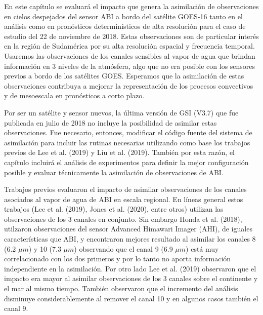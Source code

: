\documentclass[12pt,oneside,a4paper]{reedthesis}
\begin{document}
En este capítulo se evaluará el impacto que genera la asimilación de observaciones en cielos despejados del sensor ABI a bordo del satélite GOES-16 tanto en el análisis como en pronósticos determinísticos de alta resolución para el caso de estudio del 22 de noviembre de 2018. Estas observaciones son de particular interés en la región de Sudamérica por su alta resolución espacial y frecuencia temporal. Usaremos las observaciones de los canales sensibles al vapor de agua que brindan información en 3 niveles de la atmósfera, algo que no era posible con los sensores previos a bordo de los satélites GOES. Esperamos que la asimilación de estas observaciones contribuya a mejorar la representación de los procesos convectivos y de mesoescala en pronósticos a corto plazo.

Por ser un satélite y sensor nuevos, la última versión de GSI (V3.7) que fue publicada en julio de 2018 no incluye la posibilidad de asimilar estas observaciones. Fue necesario, entonces, modificar el código fuente del sistema de asimilación para incluir las rutinas necesarias utilizando como base los trabajos previos de Lee et al. (2019) y Liu et al. (2019). También por esta razón, el capítulo incluirá el análisis de experimentos para definir la mejor configuración posible y evaluar técnicamente la asimilación de observaciones de ABI.

Trabajos previos evaluaron el impacto de asimilar observaciones de los canales asociados al vapor de agua de ABI en escala regional. En líneas general estos trabajos (Lee et al. (2019), Jones et al. (2020), entre otros) utilizan las observaciones de los 3 canales en conjunto. Sin embargo Honda et al. (2018), utilzaron observaciones del sensor Advanced Himawari Imager (AHI), de iguales características que ABI, y encontraron mejores resultado al asimilar los canales 8 (6.2 \(\mu m\)) y 10 (7.3 \(\mu m\)) observando que el canal 9 (6.9 \(\mu m\)) está muy correlacionado con los dos primeros y por lo tanto no aporta información independiente en la asimilación. Por otro lado Lee et al. (2019) observaron que el impacto era mayor al asimilar observaciones de los 3 canales sobre el continente y el mar al mismo tiempo. También observaron que el incremento del análisis disminuye considerablemente al remover el canal 10 y en algunos casos también el canal 9.
\end{document}
